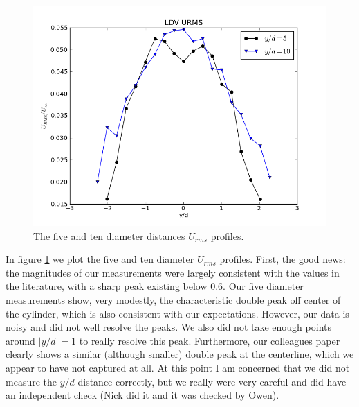\documentclass{article}
\begin{document}
\begin{figure}[!htb]
 \begin{center}
  \includegraphics[width = 12 cm]{figs/urms}
  \caption{The five and ten diameter distances $U_{rms}$ profiles. }
  \label{urms}
 \end{center}
\end{figure}

In figure \ref{urms} we plot the five and ten diameter $U_{rms}$
profiles. First, the good news: the magnitudes of our measurements were
largely consistent with the values in the literature, with a sharp peak
existing below 0.6. Our five diameter measurements show, very modestly,
the characteristic double peak off center of the cylinder, which is also
consistent with our expectations. However, our data is noisy and did not
well resolve the peaks. We also did not take enough points around $|y/d|
=1$ to really resolve this peak. Furthermore, our colleagues paper
clearly shows a similar (although smaller) double peak at the
centerline, which we appear to have not captured at all. At this point I
am concerned that we did not measure the $y/d$ distance correctly, but
we really were very careful and did have an independent check (Nick did
it and it was checked by Owen). 
\end{document}
